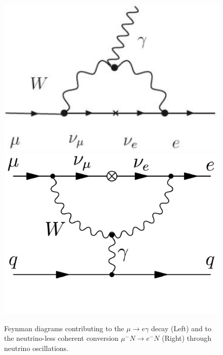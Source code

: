 \documentclass[12pt,a4paper,openright, oneside, titlepage]{book} %
\begin{document}
\begin{figure}[h!]
\includegraphics[scale=0.7]{feynman_mu-egamma}
\includegraphics[scale=0.7]{feynman_mu2e}
\caption[Feynman: $\mu\rightarrow e\gamma$; $\mu^-N \rightarrow e^-N$]{Feynman diagrams contributing to the $\mu\rightarrow e\gamma$ decay (Left) 
and to the neutrino-less coherent conversion $\mu^-N \rightarrow e^-N$ (Right)
through neutrino oscillations.}
\label{_feynman_SM}
\end{figure}
\end{document}
